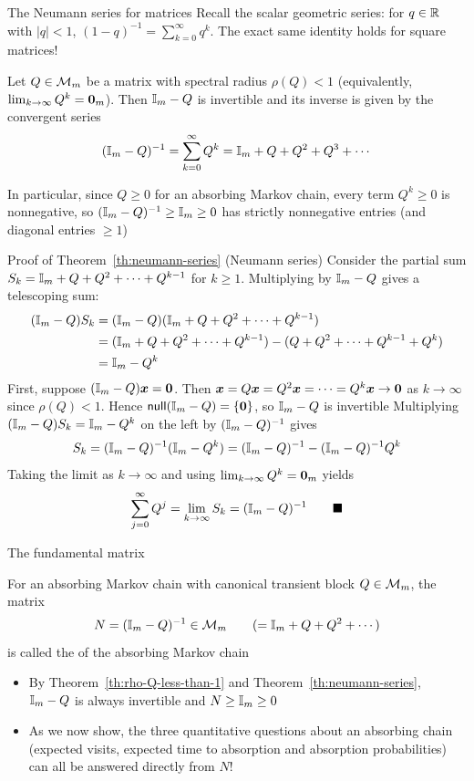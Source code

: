 \documentclass[aspectratio=169]{beamer}\usepackage[]{graphicx}\usepackage[]{xcolor}
\begin{document}
\begin{frame}{The Neumann series for matrices}
Recall the scalar geometric series: for $q \in \mathbb{R}$ with $|q| < 1$, $(1 - q)^{-1} = \sum_{k=0}^\infty q^k$. The exact same identity holds for square matrices!
\vfill
\begin{theorem}
\label{th:neumann-series}
Let $Q \in \mathcal{M}_m$ be a matrix with spectral radius $\rho(Q) < 1$ (equivalently, $\lim_{k\to\infty} Q^k = \b0_m$). Then $\mathbb{I}_m - Q$ is invertible and its inverse is given by the convergent series
\[
(\mathbb{I}_m - Q)^{-1} = \sum_{k=0}^\infty Q^k = \mathbb{I}_m + Q + Q^2 + Q^3 + \cdots
\]
\end{theorem}
\vfill
In particular, since $Q \ge 0$ for an absorbing Markov chain, every term $Q^k \ge 0$ is nonnegative, so $(\mathbb{I}_m - Q)^{-1} \ge \mathbb{I}_m \ge 0$ has strictly nonnegative entries (and diagonal entries $\ge 1$)
\end{frame}

\begin{frame}{Proof of Theorem~\ref{th:neumann-series} (Neumann series)}
Consider the partial sum $S_k = \mathbb{I}_m + Q + Q^2 + \cdots + Q^{k-1}$ for $k \ge 1$. Multiplying by $\mathbb{I}_m - Q$ gives a telescoping sum:
\begin{align*}
(\mathbb{I}_m - Q) S_k &= (\mathbb{I}_m - Q)(\mathbb{I}_m + Q + Q^2 + \cdots + Q^{k-1}) \\
&= (\mathbb{I}_m + Q + Q^2 + \cdots + Q^{k-1}) - (Q + Q^2 + \cdots + Q^{k-1} + Q^k) \\
&= \mathbb{I}_m - Q^k
\end{align*}
\vfill
First, suppose $(\II_m - Q)\bx = \b0$. Then $\bx = Q\bx = Q^2\bx = \cdots = Q^k\bx \to \b0$ as $k \to \infty$ since $\rho(Q) < 1$. Hence $\nullspace(\II_m - Q) = \{\b0\}$, so $\mathbb{I}_m - Q$ is invertible
\vfill
Multiplying $(\mathbb{I}_m - Q)S_k = \mathbb{I}_m - Q^k$ on the left by $(\mathbb{I}_m - Q)^{-1}$ gives
\[
S_k = (\mathbb{I}_m - Q)^{-1}(\mathbb{I}_m - Q^k) = (\mathbb{I}_m - Q)^{-1} - (\mathbb{I}_m - Q)^{-1}Q^k
\]
Taking the limit as $k \to \infty$ and using $\lim_{k\to\infty} Q^k = \b0_m$ yields
\[
\sum_{j=0}^\infty Q^j = \lim_{k\to\infty} S_k = (\mathbb{I}_m - Q)^{-1} \qquad \blacksquare
\]
\end{frame}

\begin{frame}{The fundamental matrix}
\begin{importantdefinition}
For an absorbing Markov chain with canonical transient block $Q \in \mathcal{M}_m$, the matrix
\[
N = (\mathbb{I}_m - Q)^{-1} \in \mathcal{M}_m \qquad (= \mathbb{I}_m + Q + Q^2 + \cdots)
\]
is called the  of the absorbing Markov chain
\end{importantdefinition}
\vfill
\begin{itemize}
\item By Theorem~\ref{th:rho-Q-less-than-1} and Theorem~\ref{th:neumann-series}, $\mathbb{I}_m - Q$ is always invertible and $N \ge \mathbb{I}_m \ge 0$
\item As we now show, the three quantitative questions about an absorbing chain (expected visits, expected time to absorption and absorption probabilities) can all be answered directly from $N$!
\end{itemize}
\end{frame}
\end{document}
